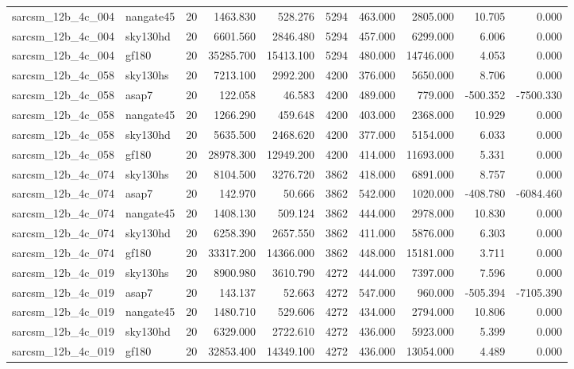 \begin{tabular}{llrrrrrrrr}
sarcsm\_12b\_4c\_004 & nangate45 & 20 & 1463.830 & 528.276 & 5294 & 463.000 & 2805.000 & 10.705 & 0.000 \\
sarcsm\_12b\_4c\_004 & sky130hd & 20 & 6601.560 & 2846.480 & 5294 & 457.000 & 6299.000 & 6.006 & 0.000 \\
sarcsm\_12b\_4c\_004 & gf180 & 20 & 35285.700 & 15413.100 & 5294 & 480.000 & 14746.000 & 4.053 & 0.000 \\
sarcsm\_12b\_4c\_058 & sky130hs & 20 & 7213.100 & 2992.200 & 4200 & 376.000 & 5650.000 & 8.706 & 0.000 \\
sarcsm\_12b\_4c\_058 & asap7 & 20 & 122.058 & 46.583 & 4200 & 489.000 & 779.000 & -500.352 & -7500.330 \\
sarcsm\_12b\_4c\_058 & nangate45 & 20 & 1266.290 & 459.648 & 4200 & 403.000 & 2368.000 & 10.929 & 0.000 \\
sarcsm\_12b\_4c\_058 & sky130hd & 20 & 5635.500 & 2468.620 & 4200 & 377.000 & 5154.000 & 6.033 & 0.000 \\
sarcsm\_12b\_4c\_058 & gf180 & 20 & 28978.300 & 12949.200 & 4200 & 414.000 & 11693.000 & 5.331 & 0.000 \\
sarcsm\_12b\_4c\_074 & sky130hs & 20 & 8104.500 & 3276.720 & 3862 & 418.000 & 6891.000 & 8.757 & 0.000 \\
sarcsm\_12b\_4c\_074 & asap7 & 20 & 142.970 & 50.666 & 3862 & 542.000 & 1020.000 & -408.780 & -6084.460 \\
sarcsm\_12b\_4c\_074 & nangate45 & 20 & 1408.130 & 509.124 & 3862 & 444.000 & 2978.000 & 10.830 & 0.000 \\
sarcsm\_12b\_4c\_074 & sky130hd & 20 & 6258.390 & 2657.550 & 3862 & 411.000 & 5876.000 & 6.303 & 0.000 \\
sarcsm\_12b\_4c\_074 & gf180 & 20 & 33317.200 & 14366.000 & 3862 & 448.000 & 15181.000 & 3.711 & 0.000 \\
sarcsm\_12b\_4c\_019 & sky130hs & 20 & 8900.980 & 3610.790 & 4272 & 444.000 & 7397.000 & 7.596 & 0.000 \\
sarcsm\_12b\_4c\_019 & asap7 & 20 & 143.137 & 52.663 & 4272 & 547.000 & 960.000 & -505.394 & -7105.390 \\
sarcsm\_12b\_4c\_019 & nangate45 & 20 & 1480.710 & 529.606 & 4272 & 434.000 & 2794.000 & 10.806 & 0.000 \\
sarcsm\_12b\_4c\_019 & sky130hd & 20 & 6329.000 & 2722.610 & 4272 & 436.000 & 5923.000 & 5.399 & 0.000 \\
sarcsm\_12b\_4c\_019 & gf180 & 20 & 32853.400 & 14349.100 & 4272 & 436.000 & 13054.000 & 4.489 & 0.000 \\

\end{tabular}

